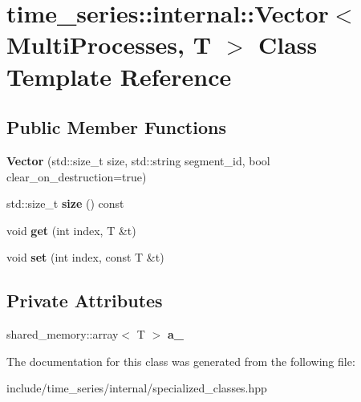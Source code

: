 \hypertarget{classtime__series_1_1internal_1_1Vector_3_01MultiProcesses_00_01T_01_4}{}\section{time\+\_\+series\+:\+:internal\+:\+:Vector$<$ Multi\+Processes, T $>$ Class Template Reference}
\label{classtime__series_1_1internal_1_1Vector_3_01MultiProcesses_00_01T_01_4}
\subsection*{Public Member Functions}
\begin{DoxyCompactItemize}
\item 
{\bfseries Vector} (std\+::size\+\_\+t size, std\+::string segment\+\_\+id, bool clear\+\_\+on\+\_\+destruction=true)\hypertarget{classtime__series_1_1internal_1_1Vector_3_01MultiProcesses_00_01T_01_4_af2529e8e4d338b81ccc7faa63bf61c15}{}\label{classtime__series_1_1internal_1_1Vector_3_01MultiProcesses_00_01T_01_4_af2529e8e4d338b81ccc7faa63bf61c15}

\item 
std\+::size\+\_\+t {\bfseries size} () const \hypertarget{classtime__series_1_1internal_1_1Vector_3_01MultiProcesses_00_01T_01_4_afbe252b31aae6d5848a77c60368b4a14}{}\label{classtime__series_1_1internal_1_1Vector_3_01MultiProcesses_00_01T_01_4_afbe252b31aae6d5848a77c60368b4a14}

\item 
void {\bfseries get} (int index, T \&t)\hypertarget{classtime__series_1_1internal_1_1Vector_3_01MultiProcesses_00_01T_01_4_a790ce3cdc41c84248ddc534466d00453}{}\label{classtime__series_1_1internal_1_1Vector_3_01MultiProcesses_00_01T_01_4_a790ce3cdc41c84248ddc534466d00453}

\item 
void {\bfseries set} (int index, const T \&t)\hypertarget{classtime__series_1_1internal_1_1Vector_3_01MultiProcesses_00_01T_01_4_a3b39a3c251c76c67ca3993d08a3374c0}{}\label{classtime__series_1_1internal_1_1Vector_3_01MultiProcesses_00_01T_01_4_a3b39a3c251c76c67ca3993d08a3374c0}

\end{DoxyCompactItemize}
\subsection*{Private Attributes}
\begin{DoxyCompactItemize}
\item 
shared\+\_\+memory\+::array$<$ T $>$ {\bfseries a\+\_\+}\hypertarget{classtime__series_1_1internal_1_1Vector_3_01MultiProcesses_00_01T_01_4_af14f14dd6be5f8905a43e0e375257d94}{}\label{classtime__series_1_1internal_1_1Vector_3_01MultiProcesses_00_01T_01_4_af14f14dd6be5f8905a43e0e375257d94}

\end{DoxyCompactItemize}


The documentation for this class was generated from the following file\+:\begin{DoxyCompactItemize}
\item 
include/time\+\_\+series/internal/specialized\+\_\+classes.\+hpp\end{DoxyCompactItemize}
